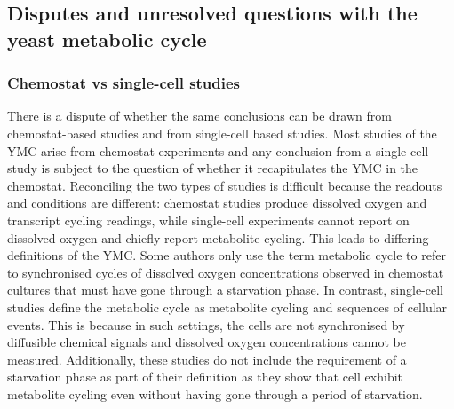
\subsection[Disputes and unresolved questions]{Disputes and unresolved questions with the yeast metabolic cycle}
\label{subsec:intro-ymc-unresolved}


\subsubsection{Chemostat vs single-cell studies}
\label{subsubsec:intro-ymc-unresolved-chemostat_singlecell}

There is a dispute of whether the same conclusions can be drawn from chemostat-based studies and from single-cell based studies.
Most studies of the YMC arise from chemostat experiments and any conclusion from a single-cell study is subject to the question of whether it recapitulates the YMC in the chemostat.
Reconciling the two types of studies is difficult because the readouts and conditions are different:
chemostat studies produce dissolved oxygen and transcript cycling readings, while single-cell experiments cannot report on dissolved oxygen and chiefly report metabolite cycling.
This leads to differing definitions of the YMC.
Some authors \parencite{laxmanBehaviorMetabolicCycling2010, caustonMetabolicRhythmsFramework2018} only use the term metabolic cycle to refer to synchronised cycles of dissolved oxygen concentrations observed in chemostat cultures that must have gone through a starvation phase.
In contrast, single-cell studies \parencite{baumgartnerFlavinbasedMetabolicCycles2018, zylstraMetabolicDynamicsCell2022} define the metabolic cycle as metabolite cycling and sequences of cellular events.
This is because in such settings, the cells are not synchronised by diffusible chemical signals and dissolved oxygen concentrations cannot be measured.
Additionally, these studies do not include the requirement of a starvation phase as part of their definition as they show that cell exhibit metabolite cycling even without having gone through a period of starvation.


